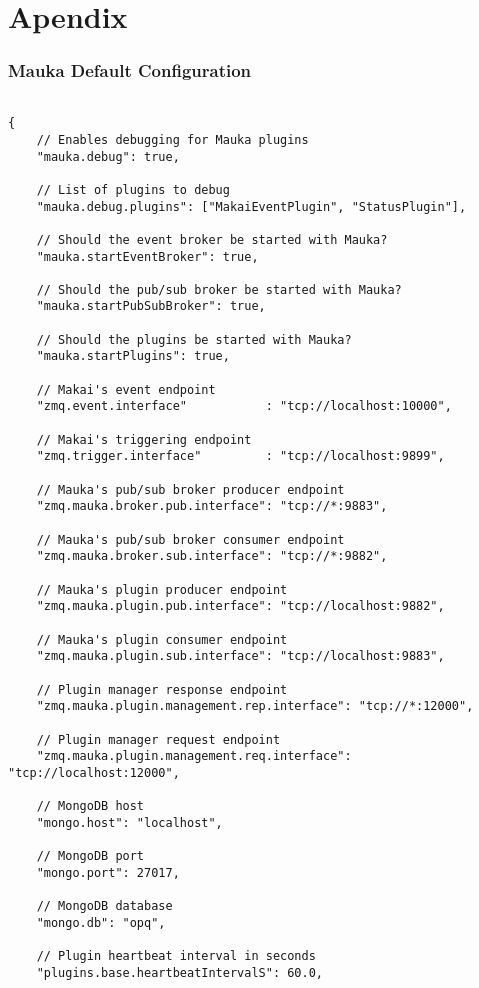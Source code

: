 \appendix
\appendixpage

\chapter{Apendix}

\subsection{Mauka Default Configuration}
\label{appendix:MaukaConfig}
\begin{verbatim}

{
	// Enables debugging for Mauka plugins
	"mauka.debug": true,

	// List of plugins to debug
	"mauka.debug.plugins": ["MakaiEventPlugin", "StatusPlugin"],

	// Should the event broker be started with Mauka?
	"mauka.startEventBroker": true,

	// Should the pub/sub broker be started with Mauka?
	"mauka.startPubSubBroker": true,

	// Should the plugins be started with Mauka?
	"mauka.startPlugins": true,

	// Makai's event endpoint
	"zmq.event.interface"           : "tcp://localhost:10000",

	// Makai's triggering endpoint
	"zmq.trigger.interface"         : "tcp://localhost:9899",

	// Mauka's pub/sub broker producer endpoint
	"zmq.mauka.broker.pub.interface": "tcp://*:9883",

	// Mauka's pub/sub broker consumer endpoint
	"zmq.mauka.broker.sub.interface": "tcp://*:9882",

	// Mauka's plugin producer endpoint
	"zmq.mauka.plugin.pub.interface": "tcp://localhost:9882",

	// Mauka's plugin consumer endpoint
	"zmq.mauka.plugin.sub.interface": "tcp://localhost:9883",

	// Plugin manager response endpoint
	"zmq.mauka.plugin.management.rep.interface": "tcp://*:12000",

	// Plugin manager request endpoint
	"zmq.mauka.plugin.management.req.interface": "tcp://localhost:12000",

	// MongoDB host
	"mongo.host": "localhost",

	// MongoDB port
	"mongo.port": 27017,

	// MongoDB database
	"mongo.db": "opq",

	// Plugin heartbeat interval in seconds
	"plugins.base.heartbeatIntervalS": 60.0,


\end{verbatim}
